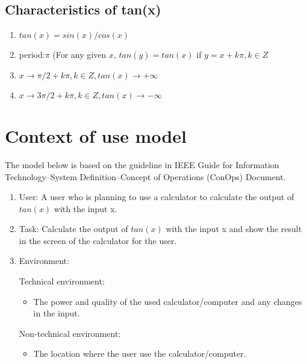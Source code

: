 \documentclass[10pt,a4paper,twoside]{article}
\begin{document}




\subsection{Characteristics of tan(x)}
\begin{enumerate}
\item $tan(x)=sin(x)/cos(x)$
\item period:$\pi$ (For any given $x$, $tan(y)=tan(x)$ if $y = x + k\pi, k \in Z$
\item $x\rightarrow \pi /2+k\pi, k\in Z,tan(x)\rightarrow+\infty$
\item $x\rightarrow3\pi/2+k\pi, k\in Z,tan(x)\rightarrow-\infty$
\end{enumerate}


\section{Context of use model}
The model below is based on the guideline in IEEE Guide for Information Technology--System Definition--Concept of Operations (ConOps) Document.
\cite{1998702}
\begin{enumerate}
\item 
User: A user who is planning to use a calculator to calculate the output of $tan(x)$ with the input x.
\item
Task: Calculate the output of $tan(x)$ with the input x and show the result in the screen of the calculator for the user.
\item
Environment:

  Technical environment:
\begin{itemize}
\item The power and quality of the used calculator/computer and any changes in the input.
\end{itemize}

  Non-technical environment:
\begin{itemize}
\item The location where the user use the calculator/computer.
\end{itemize}

\end{enumerate}


\printbibliography
\end{document}
